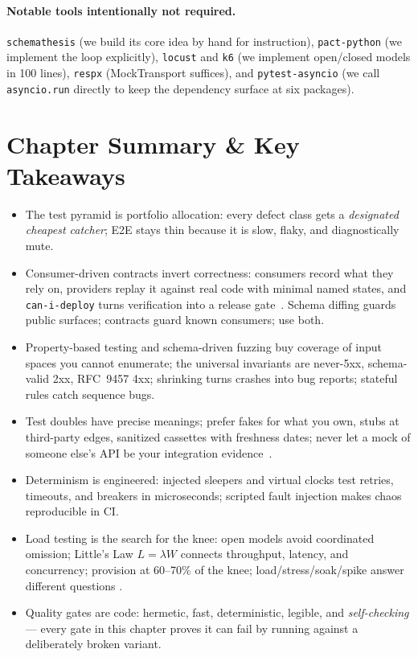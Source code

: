\paragraph{Notable tools intentionally not required.}
\texttt{schemathesis} (we build its core idea by hand for instruction),
\texttt{pact-python} (we implement the loop explicitly), \texttt{locust}
and \texttt{k6} (we implement open/closed models in 100 lines),
\texttt{respx} (MockTransport suffices), and \texttt{pytest-asyncio}
(we call \texttt{asyncio.run} directly to keep the dependency surface at
six packages).

\section{Chapter Summary \& Key Takeaways}
\label{sec:ch19-summary}

\begin{itemize}
  \item The test pyramid is portfolio allocation: every defect class gets a
        \emph{designated cheapest catcher}; E2E stays thin because it is
        slow, flaky, and diagnostically mute.
  \item Consumer-driven contracts invert correctness: consumers record what
        they rely on, providers replay it against real code with minimal
        named states, and \texttt{can-i-deploy} turns verification into a
        release gate~\cite{pactdocs}. Schema diffing guards public
        surfaces; contracts guard known consumers; use both.
  \item Property-based testing and schema-driven fuzzing buy coverage of
        input spaces you cannot enumerate; the universal invariants are
        never-5xx, schema-valid 2xx, RFC~9457 4xx; shrinking turns crashes
        into bug reports; stateful rules catch sequence bugs.
  \item Test doubles have precise meanings; prefer fakes for what you own,
        stubs at third-party edges, sanitized cassettes with freshness
        dates; never let a mock of someone else's API be your integration
        evidence~\cite{httpxdocs}.
  \item Determinism is engineered: injected sleepers and virtual clocks
        test retries, timeouts, and breakers in microseconds; scripted
        fault injection makes chaos reproducible in CI.
  \item Load testing is the search for the knee: open models avoid
        coordinated omission; Little's Law $L = \lambda W$ connects
        throughput, latency, and concurrency; provision at 60--70\% of the
        knee; load/stress/soak/spike answer different questions
        \cite{nygard2018releaseit,beyer2016sre}.
  \item Quality gates are code: hermetic, fast, deterministic, legible,
        and \emph{self-checking} --- every gate in this chapter proves it
        can fail by running against a deliberately broken variant.
\end{itemize}

